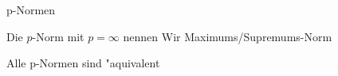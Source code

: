 \documentclass[class=article, crop=false]{standalone}
\begin{document}
\begin{zettel}{p-Normen}
\begin{flashcard}
	\begin{definition}
		Die $p$-Norm mit $p = \infty$ nennen Wir Maximums/Supremums-Norm
	\end{definition}
	\begin{theorem}
		Alle p-Normen sind "aquivalent
	\end{theorem}
\end{flashcard}
\end{zettel}
\end{document}
